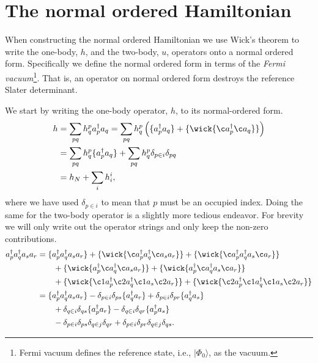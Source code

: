 \documentclass[
    a4paper, aps, twocolumn, floatfix, superscriptaddress,
    nofootinbib]{revtex4-1}
\newcommand{\1}{\mathds{1}}
\newcommand{\para}[1]{\left(#1\right)}
\newcommand{\ket}[1]{\rvert #1\rangle}
\newcommand{\acr}[1]{a_{#1}^{\dagger}}
\newcommand{\ade}[1]{a_{#1}}
\newcommand{\kslat}{\ket{\Phi_0}}
\begin{document}

\appendix
\section{The normal ordered Hamiltonian}
    When constructing the normal ordered Hamiltonian we use Wick's theorem to
    write the one-body, $h$, and the two-body, $u$, operators onto a normal
    ordered form. Specifically we define the normal ordered form in terms of the
    \emph{Fermi vacuum}\footnote{Fermi vacuum defines the reference state, i.e.,
    $\kslat$, as the vacuum.}. That is, an operator on normal ordered form
    destroys the reference Slater determinant.

    We start by writing the one-body operator, $h$, to its normal-ordered form.
    \begin{align}
        h &= \sum_{pq}h^p_q\acr{p}\ade{q}
        = \sum_{pq}h^p_q\para{
            \{\acr{p}\ade{q}\}
            + \{
                \wick{\c a_{p}^{\dagger} \c a_{q}}
            \}
        }
        \\
        &= \sum_{pq}h^p_q\{
            \acr{p}\ade{q}
        \}
        + \sum_{pq}h^p_q\delta_{p \in i}\delta_{pq}
        \\
        &= h_N + \sum_{i}h^i_i,
    \end{align}
    where we have used $\delta_{p \in i}$ to mean that $p$ must be an occupied
    index. Doing the same for the two-body operator is a slightly more tedious
    endeavor. For brevity we will only write out the operator strings and only
    keep the non-zero contributions.
    \begin{align}
        \acr{p}\acr{q}\ade{s}\ade{r}
        &=
        \{\acr{p}\acr{q}\ade{s}\ade{r}\}
        + \{
            \wick{\c a_p^{\dagger} a_{q}^{\dagger} \c a_{s} a_{r}}
        \}
        + \{
            \wick{\c a_p^{\dagger} a_{q}^{\dagger} a_{s} \c a_{r}}
        \}
        \nonumber \\
        &\qquad
        + \{
            \wick{a_p^{\dagger} \c a_{q}^{\dagger} \c a_{s} a_{r}}
        \}
        + \{
            \wick{a_p^{\dagger} \c a_{q}^{\dagger} a_{s} \c a_{r}}
        \}
        \nonumber \\
        &\qquad
        + \{
            \wick{\c1 a_p^{\dagger} \c2 a_{q}^{\dagger} \c1 a_{s} \c2 a_{r}}
        \}
        + \{
            \wick{\c2 a_p^{\dagger} \c1 a_{q}^{\dagger} \c1 a_{s} \c2 a_{r}}
        \}
        \\
        &=
        \{\acr{p}\acr{q}\ade{s}\ade{r}\}
        - \delta_{p \in i}\delta_{ps}\{\acr{q}\ade{r}\}
        + \delta_{p \in i}\delta_{pr}\{\acr{q}\ade{s}\}
        \nonumber \\
        &\qquad
        + \delta_{q \in i}\delta_{qs}\{\acr{p}\ade{r}\}
        - \delta_{q \in i}\delta_{qr}\{\acr{p}\ade{s}\}
        \nonumber \\
        &\qquad
        - \delta_{p \in i}\delta_{ps}\delta_{q \in j}\delta_{qr}
        + \delta_{p \in i}\delta_{pr}\delta_{q \in j}\delta_{qs}.
    \end{align}
\end{document}
